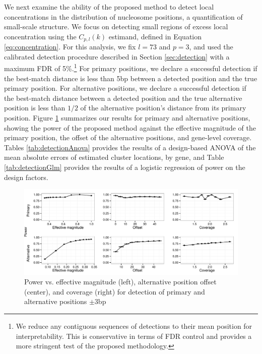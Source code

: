 We next examine the ability of the proposed method to detect local concentrations in the distribution of nucleosome positions, a quantification of small-scale structure.
We focus on detecting small regions of excess local concentration using the $C_{p,l}(k)$ estimand, defined in Equation \ref{eq:concentration}.
For this analysis, we fix $l = 73$ and $p = 3$, and used the calibrated detection procedure described in Section \ref{sec:detection} with a maximum FDR of 5\%.\footnote{We reduce any contiguous sequences of detections to their mean position for interpretability. This is conservative in terms of FDR control and provides a more stringent test of the proposed methodology.}
%
For primary positions, we declare a successful detection if the best-match distance is less than 5bp between a detected position and the true primary position.
For alternative positions, we declare a successful detection if the best-match distance between a detected position and the true alternative position is less than $1/2$ of the alternative position's distance from its primary position.
%
Figure \ref{fig:powerLocal} summarizes our results for primary and alternative positions, showing the power of the proposed method against the effective magnitude of the primary position, the offset of the alternative positions, and gene-level coverage.
Tables \ref{tab:detectionAnova} provides the results of a design-based ANOVA of the mean absolute errors of  estimated cluster locations, by gene, and Table \ref{tab:detectionGlm} provides the results of a logistic regression of power on the design factors.
%
\ifx\nofigures\undefined
\begin{figure}
\centering
\includegraphics[width=\textwidth]{figures/nucleosomes/figure_power_combined-pm3_3-panel}
\caption{Power vs. effective magnitude (left), alternative position offset (center), and coverage (right) for detection of primary and alternative positions $\pm 3$bp \label{fig:powerLocal}}
\end{figure}

